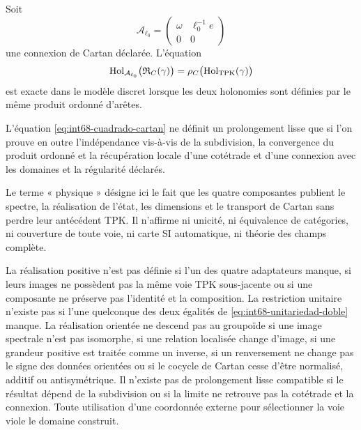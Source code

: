 Soit
\[
 \mathcal A_{\ell_0}
 =\begin{pmatrix}\omega&\ell_0^{-1}e\\0&0\end{pmatrix}
\]
une connexion de Cartan déclarée. L'équation
\begin{equation}
 \operatorname{Hol}_{\mathcal A_{\ell_0}}
   \bigl(\mathfrak R_C(\gamma)\bigr)
 =\rho_C\bigl(\operatorname{Hol}_{\rm TPK}(\gamma)\bigr)
 \label{eq:int68-cuadrado-cartan}
\end{equation}
est exacte dans le modèle discret lorsque les deux holonomies sont définies par le
même produit ordonné d'arêtes.

\begin{criterion}
\label{crit:int68-cartan-suave}
L'équation \eqref{eq:int68-cuadrado-cartan} ne définit un prolongement
lisse que si l'on prouve en outre l'indépendance vis-à-vis de la subdivision, la convergence du
produit ordonné et la récupération locale d'une cotétrade et d'une connexion avec
les domaines et la régularité déclarés.
\end{criterion}

Le terme « physique » désigne ici le fait que les quatre composantes publient
le spectre, la réalisation de l'état, les dimensions et le transport de Cartan sans
perdre leur antécédent TPK\@. Il n'affirme ni unicité, ni équivalence de catégories,
ni couverture de toute voie, ni carte SI automatique, ni théorie des champs complète.

\begin{criterion}
\label{crit:int68-obstrucciones-realizacion}
La réalisation positive n'est pas définie si l'un des quatre
adaptateurs manque, si leurs images ne possèdent pas la même voie TPK sous-jacente ou si une
composante ne préserve pas l'identité et la composition. La restriction unitaire
n'existe pas si l'une quelconque des deux égalités de
\eqref{eq:int68-unitariedad-doble} manque. La réalisation orientée ne descend pas au
groupoïde si une image spectrale n'est pas isomorphe, si une relation localisée
change d'image, si une grandeur positive est traitée comme un inverse, si un
renversement ne change pas le signe des données orientées ou si le cocycle de
Cartan cesse d'être normalisé, additif ou antisymétrique. Il n'existe pas de
prolongement lisse compatible si le résultat dépend de la subdivision ou si
la limite ne retrouve pas la cotétrade et la connexion. Toute utilisation d'une coordonnée
externe pour sélectionner la voie viole le domaine construit.
\end{criterion}

